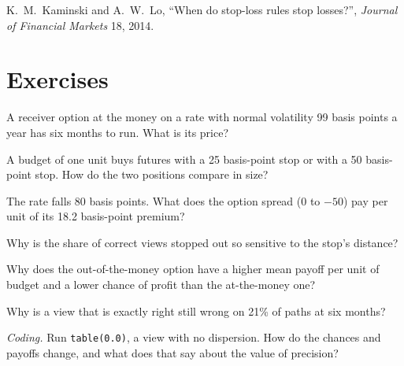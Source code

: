 \begin{omsources}
\item K.~M.~Kaminski and A.~W.~Lo, ``When do stop-loss rules stop losses?'', \emph{Journal of Financial Markets} 18, 2014.
\end{omsources}

\section{Exercises}

\begin{exercise}[$\star$]\label{exo:s2:discretionary-macro:1}
A receiver option at the money on a rate with normal volatility 99 basis points a year has six months to run. What is its price?
\end{exercise}

\begin{exercise}[$\star$]\label{exo:s2:discretionary-macro:2}
A budget of one unit buys futures with a 25 basis-point stop or with a 50 basis-point stop. How do the two positions compare in size?
\end{exercise}

\begin{exercise}[$\star$]\label{exo:s2:discretionary-macro:3}
The rate falls 80 basis points. What does the option spread (0 to $-50$) pay per unit of its 18.2 basis-point premium?
\end{exercise}

\begin{exercise}[$\star\star$]\label{exo:s2:discretionary-macro:4}
Why is the share of correct views stopped out so sensitive to the stop's distance?
\end{exercise}

\begin{exercise}[$\star\star$]\label{exo:s2:discretionary-macro:5}
Why does the out-of-the-money option have a higher mean payoff per unit of budget and a lower chance of profit than the at-the-money one?
\end{exercise}

\begin{exercise}[$\star\star$]\label{exo:s2:discretionary-macro:6}
Why is a view that is exactly right still wrong on 21\% of paths at six months?
\end{exercise}

\begin{exercise}[$\star\star\star$]\label{exo:s2:discretionary-macro:7}
\emph{Coding.} Run \texttt{table(0.0)}, a view with no dispersion. How do the chances and payoffs change, and what does that say about the value of
precision?
\end{exercise}

